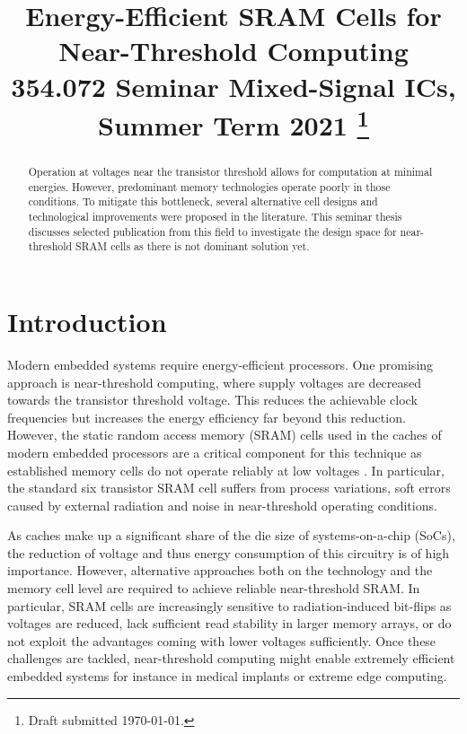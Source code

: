 \documentclass[conference]{IEEEtran}
\begin{document}
\title{Energy-Efficient SRAM Cells for Near-Threshold Computing\\
{\normalsize 354.072 Seminar Mixed-Signal ICs, Summer Term 2021}
\thanks{Draft submitted \today.}
}

\author{
}

\maketitle

\begin{abstract}
Operation at voltages near the transistor threshold allows for computation at minimal energies. However, predominant memory technologies operate poorly in those conditions. To mitigate this bottleneck, several alternative cell designs and technological improvements were proposed in the literature. This seminar thesis discusses selected publication from this field to investigate the design space for near-threshold SRAM cells as there is not dominant solution yet.
\end{abstract}

\section{Introduction} \label{sec:intro}

Modern embedded systems require energy-efficient processors. One promising approach is near-threshold computing, where supply voltages are decreased towards the transistor threshold voltage. This reduces the achievable clock frequencies but increases the energy efficiency far beyond this reduction. However, the static random access memory (SRAM) cells used in the caches of modern embedded processors are a critical component for this technique as established memory cells do not operate reliably at low voltages \cite{De2017}. In particular, the standard six transistor SRAM cell suffers from process variations, soft errors caused by external radiation and noise in near-threshold operating conditions.

As caches make up a significant share of the die size of systems-on-a-chip (SoCs), the reduction of voltage and thus energy consumption of this circuitry is of high importance. However, alternative approaches both on the technology and the memory cell level are required to achieve reliable near-threshold SRAM. In particular, SRAM cells are increasingly sensitive to radiation-induced bit-flips as voltages are reduced, lack sufficient read stability in larger memory arrays, or do not exploit the advantages coming with lower voltages sufficiently. Once these challenges are tackled, near-threshold computing might enable extremely efficient embedded systems for instance in medical implants or extreme edge computing.
\end{document}
